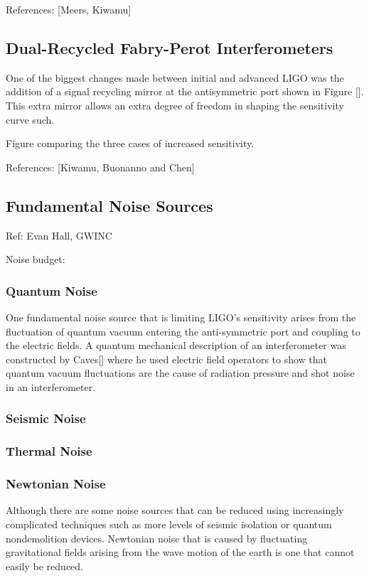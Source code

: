 		
		
		References: [Meers, Kiwamu]
		
		\subsection{Dual-Recycled Fabry-Perot Interferometers}
		
		One of the biggest changes made between initial and advanced LIGO was the addition of a signal recycling mirror at the antisymmetric port shown in Figure []. This extra mirror allows an extra degree of freedom in shaping the sensitivity curve such.
		
		
		Figure comparing the three cases of increased sensitivity.
		
		References: [Kiwamu, Buonanno and Chen]
		
		\subsection{Fundamental Noise Sources}
		Ref: Evan Hall, GWINC

		Noise budget:

		\subsubsection{Quantum Noise}
		One fundamental noise source that is limiting LIGO's sensitivity arises from the fluctuation of quantum vacuum entering the anti-symmetric port and coupling to the electric fields.  A quantum mechanical description of an interferometer was constructed by Caves[] where he used electric field operators to show that quantum vacuum fluctuations are the cause of radiation pressure and shot noise in an interferometer.
		
		
		\subsubsection{Seismic Noise}
		\subsubsection{Thermal Noise}
		\subsubsection{Newtonian Noise}
		Although there are some noise sources that can be reduced using increasingly complicated techniques such as more levels of seismic isolation or quantum nondemolition devices.  Newtonian noise that is caused by fluctuating gravitational fields arising from the wave motion of the earth is one that cannot easily be reduced.
		
